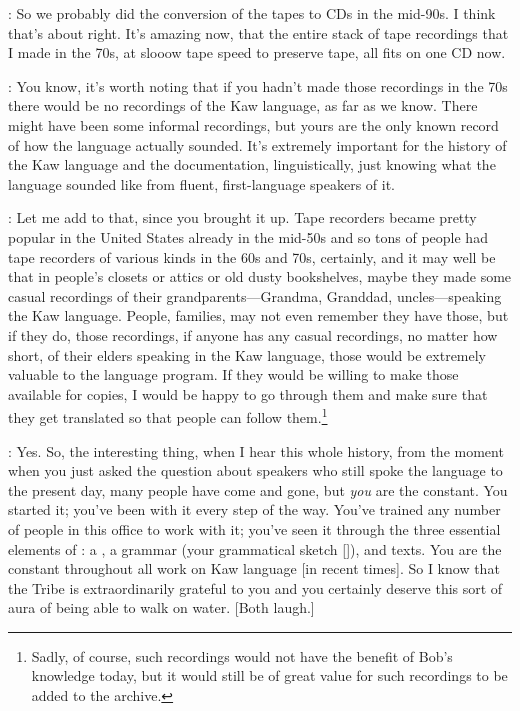 \documentclass[output=paper]{LSP/langsci}
\begin{document}
: So we probably did the conversion of the tapes to CDs in the mid-90s. I think that's about right. It's amazing now, that the entire stack of tape recordings that I made in the 70s, at slooow tape speed to preserve tape, all fits on one CD now.

: You know, it's worth noting that if you hadn't made those recordings in the 70s there would be no recordings of the Kaw language, as far as we know. There might have been some informal recordings, but yours are the only known record of how the language actually sounded. It's extremely important for the history of the Kaw language and the documentation, linguistically, just knowing what the language sounded like from fluent, first-language speakers of it.

: Let me add to that, since you brought it up. Tape recorders became pretty popular in the United States already in the mid-50s and so tons of people had tape recorders of various kinds in the 60s and 70s, certainly, and it may well be that in people's closets or attics or old dusty bookshelves, maybe they made some casual recordings of their grandparents---Grandma, Granddad, uncles---speaking the Kaw language. People, families, may not even remember they have those, but if they do, those recordings, if anyone has any casual recordings, no matter how short, of their elders speaking in the Kaw language, those would be extremely valuable to the language program. If they would be willing to make those available for copies, I would be happy to go through them and make sure that they get translated so that people can follow them.\footnote{Sadly, of course, such recordings would not have the benefit of Bob's knowledge today, but it would still be of great value for such recordings to be added to the archive.}

: Yes. So, the interesting thing, when I hear this whole history, from the moment when you just asked the question about speakers who still spoke the language to the present day, many people have come and gone, but \textit{you} are the constant. You started it; you've been with it every step of the way. You've trained any number of people in this office to work with it; you've seen it through the three essential elements of : a , a grammar (your grammatical sketch [\citealt{Rankin1989}]), and texts. You are the constant throughout all work on Kaw language [in recent times]. So I know that the Tribe is extraordinarily grateful to you and you certainly deserve this sort of aura of being able to walk on water. [Both laugh.]
\end{document}
